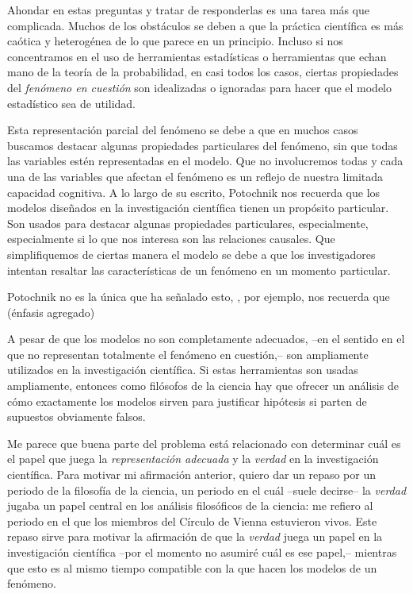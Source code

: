 Ahondar en estas preguntas y tratar de responderlas es una tarea más que complicada.
Muchos de los obstáculos se deben a que la práctica científica es más caótica y heterogénea de lo que parece en un principio.
Incluso si nos concentramos en el uso de herramientas estadísticas o herramientas que echan mano de la teoría de la probabilidad, en casi todos los casos, ciertas propiedades del \emph{fenómeno en cuestión} son idealizadas o ignoradas para hacer que el modelo estadístico sea de utilidad.

Esta representación parcial del fenómeno se debe a que en muchos casos buscamos destacar algunas propiedades particulares del fenómeno, sin que todas las variables estén representadas en el modelo.
Que no involucremos todas y cada una de las variables que afectan el fenómeno es un reflejo de nuestra limitada capacidad cognitiva.
A lo largo de su escrito, Potochnik nos recuerda que los modelos diseñados en la investigación científica tienen un propósito particular.
Son usados para destacar algunas propiedades particulares, especialmente, especialmente si lo que nos interesa son las relaciones causales.
Que simplifiquemos de ciertas manera el modelo se debe a que los investigadores intentan resaltar las características de un fenómeno en un momento particular.

Potochnik no es la única que ha señalado esto,
\textcite[][p.24]{abrams2023evolution}, por ejemplo, nos recuerda que  (énfasis agregado)

A pesar de que los modelos no son completamente adecuados, --en el sentido en el que no representan totalmente el fenómeno en cuestión,-- son ampliamente utilizados en la investigación científica.
Si estas herramientas son usadas ampliamente, entonces como filósofos de la ciencia hay que ofrecer un análisis de cómo exactamente los modelos sirven para justificar hipótesis si parten de supuestos obviamente falsos.

Me parece que buena parte del problema está relacionado con determinar cuál es el papel que juega la \emph{representación adecuada} y la \emph{verdad} en la investigación científica.
Para motivar mi afirmación anterior, quiero dar un repaso por un periodo de la filosofía de la ciencia, un periodo en el cuál --suele decirse-- la \emph{verdad} jugaba un papel central en los análisis filosóficos de la ciencia: me refiero al periodo en el que los miembros del Círculo de Vienna estuvieron vivos.
Este repaso sirve para motivar la afirmación de que la \emph{verdad} juega un papel en la investigación científica --por el momento no asumiré cuál es ese papel,-- mientras que esto es al mismo tiempo compatible con la  que hacen los modelos de un fenómeno.

